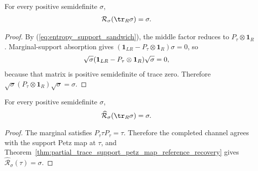 \begin{theorem}
    \label{thm:partial_trace_support_petz_map_reference_recovery}
    \leanok
    For every positive semidefinite $\sigma$,
    \begin{align}
        \mathcal R_\sigma(\tr_R\sigma)
        &=\sigma.
        \label{eq:entropy_support_petz_recovery}
    \end{align}
\end{theorem}

\begin{proof}\leanok
    By (\ref{eq:entropy_support_sandwich}), the middle factor reduces to
    $P_\tau\otimes\mathbf 1_R$. Marginal-support absorption gives
    $(\mathbf 1_{LR}-P_\tau\otimes\mathbf 1_R)\sigma=0$, so
    \begin{align}
        \sqrt\sigma(\mathbf 1_{LR}-P_\tau\otimes\mathbf 1_R)\sqrt\sigma
        &=0,
        \notag
    \end{align}
    because that matrix is positive semidefinite of trace zero. Therefore
    $\sqrt\sigma(P_\tau\otimes\mathbf 1_R)\sqrt\sigma=\sigma$.
\end{proof}

\begin{theorem}
    \label{thm:partial_trace_petz_channel_reference_recovery}
    \leanok
    For every positive semidefinite $\sigma$,
    \begin{align}
        \widehat{\mathcal R}_\sigma(\tr_R\sigma)
        &=\sigma.
        \label{eq:entropy_completed_petz_recovery}
    \end{align}
\end{theorem}

\begin{proof}\leanok
    The marginal satisfies $P_\tau\tau P_\tau=\tau$. Therefore the completed
    channel agrees with the support Petz map at $\tau$, and
    Theorem~\ref{thm:partial_trace_support_petz_map_reference_recovery} gives
    $\widehat{\mathcal R}_\sigma(\tau)=\sigma$.
\end{proof}

